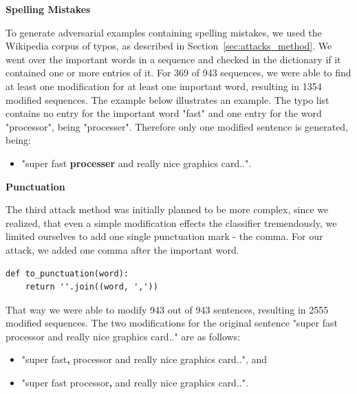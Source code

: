 \textbf{Spelling Mistakes}

To generate adversarial examples containing spelling mistakes, we used the Wikipedia corpus of typos, as described in Section~\ref{sec:attacks_method}. We went over the important words in a sequence and checked in the dictionary if it contained one or more entries of it. For 369 of 943 sequences, we were able to find at least one modification for at least one important word, resulting in 1354  modified sequences.
The example below illustrates an example. The typo list contains no entry for the important word "fast" and one entry for the word "processor", being "processer". Therefore only one modified sentence is generated, being:

\begin{itemize}
    \item "super fast \textbf{processer} and really nice graphics card..".
\end{itemize}

\textbf{Punctuation}

The third attack method was initially planned to be more complex, since we realized, that even a simple modification effects the classifier tremendously, we limited ourselves to add one single punctuation mark - the comma. For our attack, we added one comma after the important word. 

\begin{lstlisting}
def to_punctuation(word):
    return ''.join((word, ','))
\end{lstlisting}

That way we were able to modify 943 out of 943 sentences, resulting in 2555 modified sequences. The two modifications for the original sentence "super fast processor and really nice graphics card.." are as follows:

\begin{itemize}
    \item "super fast\textbf{,} processor and really nice graphics card..", and
    \item "super fast processor\textbf{,} and really nice graphics card..".
\end{itemize}


